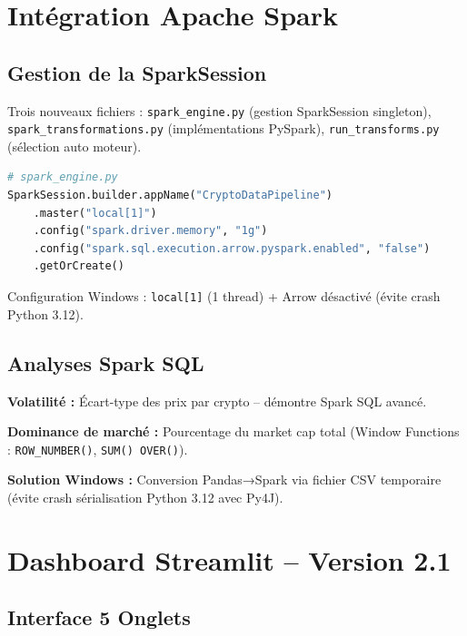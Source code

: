 \documentclass[11pt,a4paper]{article}
\begin{document}
\section{Intégration Apache Spark}

\subsection{Gestion de la SparkSession}

Trois nouveaux fichiers : \texttt{spark\_engine.py} (gestion SparkSession singleton), \texttt{spark\_transformations.py} (implémentations PySpark), \texttt{run\_transforms.py} (sélection auto moteur).

\begin{lstlisting}[language=Python]
# spark_engine.py
SparkSession.builder.appName("CryptoDataPipeline")
    .master("local[1]")
    .config("spark.driver.memory", "1g")
    .config("spark.sql.execution.arrow.pyspark.enabled", "false")
    .getOrCreate()
\end{lstlisting}

Configuration Windows : \texttt{local[1]} (1 thread) + Arrow désactivé (évite crash Python 3.12).

\subsection{Analyses Spark SQL}

\textbf{Volatilité :} Écart-type des prix par crypto -- démontre Spark SQL avancé.

\textbf{Dominance de marché :} Pourcentage du market cap total (Window Functions : \texttt{ROW\_NUMBER()}, \texttt{SUM() OVER()}).

\textbf{Solution Windows :} Conversion Pandas→Spark via fichier CSV temporaire (évite crash sérialisation Python 3.12 avec Py4J).

\section{Dashboard Streamlit -- Version 2.1}

\subsection{Interface 5 Onglets}
\end{document}
